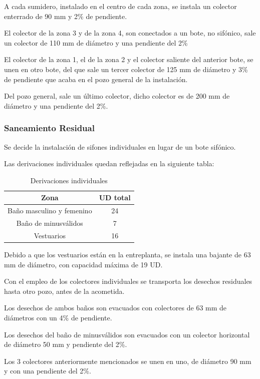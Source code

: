 \documentclass[../main.tex]{subfiles}
\begin{document}
A cada sumidero, instalado en el centro de cada zona, se instala un colector enterrado de 90 mm y 2\% de pendiente.

El colector de la zona 3 y de la zona 4, son conectados a un bote, no sifónico, sale un colector de 110 mm de diámetro y una pendiente del 2\%

El colector de la zona 1, el de la zona 2 y el colector saliente del anterior bote, se unen en otro bote, del que sale un tercer colector de 125 mm de diámetro y 3\% de pendiente que acaba en el pozo general de la instalación.

Del pozo general, sale un último colector, dicho colector es de 200 mm de diámetro y una pendiente del 2\%.

\subsubsection{Saneamiento Residual}

Se decide la instalación de sifones individuales en lugar de un bote sifónico.

Las derivaciones individuales quedan reflejadas en la siguiente tabla:

\begin{table}[H]
    \centering
    \begin{tabular}{c|c}
    Zona & UD total \\ \hline
    Baño masculino y femenino & 24 \\
    Baño de minusválidos & 7 \\
    Vestuarios & 16 \\
    \end{tabular}
    \caption{Derivaciones individuales}
\end{table}

Debido a que los vestuarios están en la entreplanta, se instala una bajante de 63 mm de diámetro, con capacidad máxima de 19 UD.

Con el empleo de los colectores individuales se transporta los desechos residuales hasta otro pozo, antes de la acometida. 

Los desechos de ambos baños son evacuados con colectores de 63 mm de diámetros con un 4\% de pendiente.

Los desechos del baño de minusválidos son evacuados con un colector horizontal de diámetro 50 mm y pendiente del 2\%.

Los 3 colectores anteriormente mencionados se unen en uno, de diámetro 90 mm y con una pendiente del 2\%.
\end{document}
